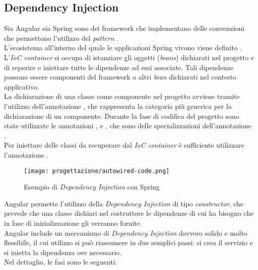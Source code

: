 \subsection{Dependency Injection}
\label{sub:Dependency-Injection}
Sia Angular sia Spring sono dei \gls{framework} che implementano delle convenzioni che permettono l'utilizzo del \textit{pattern} .\\
L'ecosistema all'interno del quale le applicazioni Spring vivono viene definito . L'\textit{IoC container} si occupa di istanziare gli oggetti (\textit{beans}) dichiarati nel progetto e di reperire e iniettare tutte le dipendenze ad essi associate. Tali dipendenze possono essere componenti del \gls{framework} o altri \textit{bean} dichiarati nel contesto applicativo.\\
La dichiarazione di una classe come componente nel progetto avviene tramite l'utilizzo dell'annotazione , che rappresenta la categoria più generica per la dichiarazione di un componente.
Durante la fase di codifica del progetto sono state utilizzate le annotazioni ,  e , che sono delle specializzazioni dell'annotazione .\\
Per iniettare delle classi da recuperare dal \textit{IoC container} è sufficiente utilizzare l'annotazione .
\begin{figure}[H] 
    \centering 
    \texttt{[image: progettazione/autowired-code.png]}
    \caption{Esempio di \textit{Dependency Injection} con Spring}
\end{figure}
\noindent Angular permette l'utilizzo della \textit{Dependency Injection} di tipo \textit{constructor}, che prevede che una classe dichiari nel costruttore le dipendenze di cui ha bisogno che in fase di inizializzazione gli verranno fornite.\\
Angular include un meccanismo di \textit{Dependency Injection} davvero solido e molto flessibile, il cui utilizzo si può riassumere in due semplici passi: si crea il servizio e si inietta la dipendenza ove necessario.\\
Nel dettaglio, le fasi sono le seguenti: 
